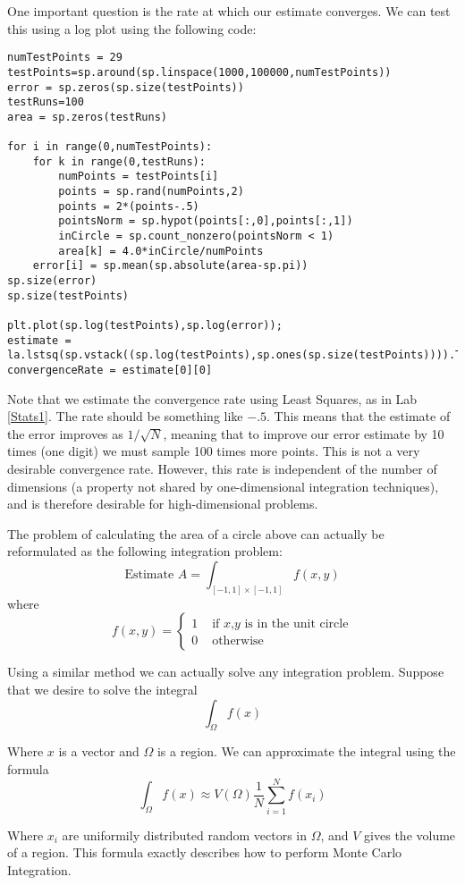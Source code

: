 One important question is the rate at which our estimate converges. We can test this using a log plot using the following code:
\begin{lstlisting}
numTestPoints = 29
testPoints=sp.around(sp.linspace(1000,100000,numTestPoints))
error = sp.zeros(sp.size(testPoints))
testRuns=100
area = sp.zeros(testRuns)

for i in range(0,numTestPoints):
	for k in range(0,testRuns):
		numPoints = testPoints[i]
		points = sp.rand(numPoints,2)
		points = 2*(points-.5)
		pointsNorm = sp.hypot(points[:,0],points[:,1])
		inCircle = sp.count_nonzero(pointsNorm < 1)
		area[k] = 4.0*inCircle/numPoints
	error[i] = sp.mean(sp.absolute(area-sp.pi))
sp.size(error)
sp.size(testPoints)

plt.plot(sp.log(testPoints),sp.log(error));
estimate = la.lstsq(sp.vstack((sp.log(testPoints),sp.ones(sp.size(testPoints)))).T,sp.log(error))
convergenceRate = estimate[0][0]
\end{lstlisting}

Note that we estimate the convergence rate using Least Squares, as in Lab \ref{Stats1}. The rate should be something like $-.5$. This means that the estimate of the error improves as $1/\sqrt{N}$, meaning that to improve our error estimate by 10 times (one digit) we must sample 100 times more points. This is not a very desirable convergence rate. However, this rate is independent of the number of dimensions (a property not shared by one-dimensional integration techniques), and is therefore desirable for high-dimensional problems.

The problem of calculating the area of a circle above can actually be reformulated as the following integration problem:
\[
\mbox{Estimate }A = \int_{[-1,1]\times[-1,1]} f(x,y)
\]
where
\[
f(x,y) = \begin{cases} 1 &\mbox{ if $x$,$y$ is in the unit circle} \\ 0 &\mbox{ otherwise} \end{cases}
\]

Using a similar method we can actually solve any integration problem. Suppose that we desire to solve the integral
\[
\int_\Omega f(x)
\]

Where $x$ is a vector and $\Omega$ is a region. We can approximate the integral using the formula
\[
\int_\Omega f(x) \approx V(\Omega) \frac{1}{N} \sum_{i=1}^N f(x_i)
\]

Where $x_i$ are uniformily distributed random vectors in $\Omega$, and $V$ gives the volume of a region. This formula exactly describes how to perform Monte Carlo Integration.

